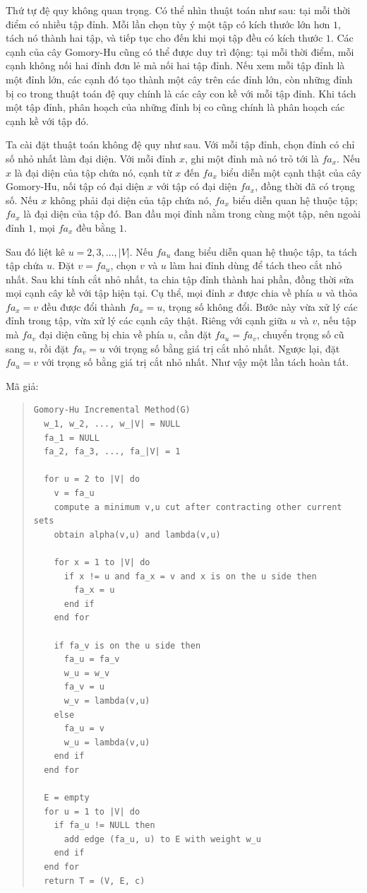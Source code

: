 \documentclass[11pt]{article}
\begin{document}
Thứ tự đệ quy không quan trọng. Có thể nhìn thuật toán như sau: tại mỗi thời
điểm có nhiều tập đỉnh. Mỗi lần chọn tùy ý một tập có kích thước lớn hơn
\(1\), tách nó thành hai tập, và tiếp tục cho đến khi mọi tập đều có kích
thước \(1\). Các cạnh của cây Gomory-Hu cũng có thể được duy trì động: tại
mỗi thời điểm, mỗi cạnh không nối hai đỉnh đơn lẻ mà nối hai tập đỉnh. Nếu
xem mỗi tập đỉnh là một đỉnh lớn, các cạnh đó tạo thành một cây trên các đỉnh
lớn, còn những đỉnh bị co trong thuật toán đệ quy chính là các cây con kề với
mỗi tập đỉnh. Khi tách một tập đỉnh, phân hoạch của những đỉnh bị co cũng
chính là phân hoạch các cạnh kề với tập đó.

Ta cài đặt thuật toán không đệ quy như sau. Với mỗi tập đỉnh, chọn đỉnh có
chỉ số nhỏ nhất làm đại diện. Với mỗi đỉnh \(x\), ghi một đỉnh mà nó trỏ tới
là \(fa_x\). Nếu \(x\) là đại diện của tập chứa nó, cạnh từ \(x\) đến
\(fa_x\) biểu diễn một cạnh thật của cây Gomory-Hu, nối tập có đại diện \(x\)
với tập có đại diện \(fa_x\), đồng thời đã có trọng số. Nếu \(x\) không phải
đại diện của tập chứa nó, \(fa_x\) biểu diễn quan hệ thuộc tập; \(fa_x\) là
đại diện của tập đó. Ban đầu mọi đỉnh nằm trong cùng một tập, nên ngoài đỉnh
\(1\), mọi \(fa_x\) đều bằng \(1\).

Sau đó liệt kê \(u=2,3,\ldots,|V|\). Nếu \(fa_u\) đang biểu diễn quan hệ
thuộc tập, ta tách tập chứa \(u\). Đặt \(v=fa_u\), chọn \(v\) và \(u\) làm hai
đỉnh dùng để tách theo cắt nhỏ nhất. Sau khi tính cắt nhỏ nhất, ta chia tập
đỉnh thành hai phần, đồng thời sửa mọi cạnh cây kề với tập hiện tại. Cụ thể,
mọi đỉnh \(x\) được chia về phía \(u\) và thỏa \(fa_x=v\) đều được đổi thành
\(fa_x=u\), trọng số không đổi. Bước này vừa xử lý các đỉnh trong tập, vừa xử
lý các cạnh cây thật. Riêng với cạnh giữa \(u\) và \(v\), nếu tập mà \(fa_v\)
đại diện cũng bị chia về phía \(u\), cần đặt \(fa_u=fa_v\), chuyển trọng số
cũ sang \(u\), rồi đặt \(fa_v=u\) với trọng số bằng giá trị cắt nhỏ nhất.
Ngược lại, đặt \(fa_u=v\) với trọng số bằng giá trị cắt nhỏ nhất. Như vậy một
lần tách hoàn tất.

Mã giả:
\begin{quote}
\small
\begin{verbatim}
Gomory-Hu Incremental Method(G)
  w_1, w_2, ..., w_|V| = NULL
  fa_1 = NULL
  fa_2, fa_3, ..., fa_|V| = 1

  for u = 2 to |V| do
    v = fa_u
    compute a minimum v,u cut after contracting other current sets
    obtain alpha(v,u) and lambda(v,u)

    for x = 1 to |V| do
      if x != u and fa_x = v and x is on the u side then
        fa_x = u
      end if
    end for

    if fa_v is on the u side then
      fa_u = fa_v
      w_u = w_v
      fa_v = u
      w_v = lambda(v,u)
    else
      fa_u = v
      w_u = lambda(v,u)
    end if
  end for

  E = empty
  for u = 1 to |V| do
    if fa_u != NULL then
      add edge (fa_u, u) to E with weight w_u
    end if
  end for
  return T = (V, E, c)
\end{verbatim}
\end{quote}
\end{document}
